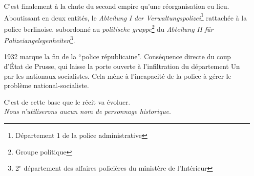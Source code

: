 C'est finalement à la chute du second empire qu'une réorganisation eu lieu. 
Aboutissant en deux entités, le \textit{Abteilung I der Verwaltungspolizei}\footnote{Département 1 de la police administrative}
rattachée à la police berlinoise, subordonné au \textit{politische gruppe}\footnote{Groupe politique} du \textit{Abteilung II für Polizeiangelegenheiten}\footnote{2$^e$ département des affaires policières du ministère de l'Intérieur}.

1932 marque la fin de la \enquote{police républicaine}. Conséquence directe du coup d'État de Prusse, 
qui laisse la porte ouverte à l'infiltration du département Un par les nationaux-socialistes. 
Cela mène à l'incapacité de la police à gérer le problème national-socialiste.

C'est de cette base que le récit va évoluer.\\
\textit{Nous n'utiliserons aucun nom de personnage historique.}